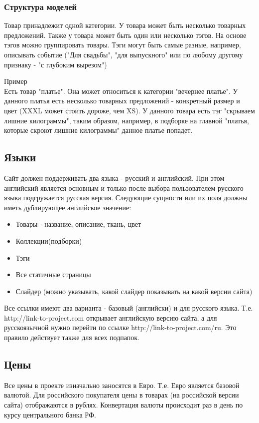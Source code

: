 \documentclass[DIV=calc, paper=a4, fontsize=11pt]{scrartcl} %
\begin{document}
\subsubsection{Структура моделей}

Товар принадлежит одной категории. У товара может быть несколько товарных предложений. Также у товара может быть один или несколько тэгов. На основе тэгов можно группировать товары. Тэги могут быть самые разные, например, описывать событие ("Для свадьбы", "для выпускного" или по любому другому признаку - "с глубоким вырезом")
\begin{framed}
Пример
\\[0.5cm]
Есть товар "платье". Она может относиться к категории "вечернее платье". У данного платья есть несколько товарных предложений - конкретный размер и цвет (XXXL может стоить дороже, чем XS). У данного товара есть тэг "скрываем лишние килограммы", таким образом, например, в подборке на главной "платья, которые скроют лишние килограммы" данное платье попадет.
\end{framed}

\subsection{Языки}
Сайт должен поддерживать два языка - русский и английский. При этом английский является основным и только после выбора пользователем русского языка подгружается русская версия. Следующие сущности или их поля должны иметь дублирующее английское значение:
\begin{itemize}
	\item Товары - название, описание, ткань, цвет
	\item Коллекции(подборки)
	\item Тэги
	\item Все статичные страницы
	\item Слайдер (можно указывать, какой слайдер показывать на какой версии сайта)
\end{itemize}
Все ссылки имеют два варианта - базовый (английски) и для русского языка. Т.е. http://link-to-project.com открывает английскую версию сайта, а для русскоязычной нужно перейти по ссылке http://link-to-project.com/ru. Это правило действует также для всех подпапок.

\subsection{Цены}
Все цены в проекте изначально заносятся в Евро. Т.е. Евро является базовой валютой. Для российского покупателя цены в товарах (на российской версии сайта) отображаются в рублях. Конвертация валюты происходит раз в день по курсу центрального банка РФ.
\end{document}
